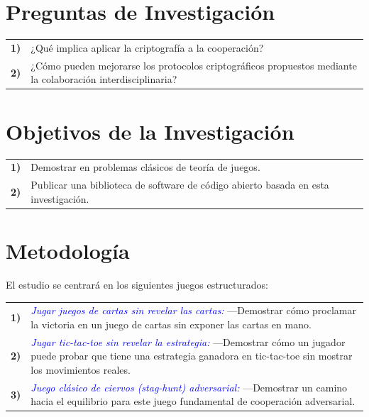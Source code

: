 \documentclass[conference]{IEEEtran}
\begin{document}
\vspace{-5pt}
\section{Preguntas de Investigación}

\begin{tabular}{lp{210pt}}
    {\small \textbf{1)}} & {\small ¿Qué implica aplicar la criptografía a la cooperación?} \\ 
    {\small \textbf{2)}} & {\small ¿Cómo pueden mejorarse los protocolos criptográficos propuestos mediante la colaboración interdisciplinaria?}
\end{tabular}
    
\vspace{-5pt}
\section{Objetivos de la Investigación}

\begin{tabular}{lp{210pt}}
    {\small \textbf{1)}} & {\small Demostrar en problemas clásicos de teoría de juegos.} \\ 
    {\small \textbf{2)}} & {\small Publicar una biblioteca de software de código abierto basada en esta investigación.}
\end{tabular}

\vspace{-5pt}
\section{Metodología}
El estudio se centrará en los siguientes juegos estructurados:

\begin{tabular}{lp{210pt}}
    {\small \textbf{1)}} & {\textcolor{blue}{\textit{Jugar juegos de cartas sin revelar las cartas:}} \linebreak ---Demostrar cómo proclamar la victoria en un juego de cartas sin exponer las cartas en mano.} \\
    {\small \textbf{2)}} & {\textcolor{blue}{\textit{Jugar tic-tac-toe sin revelar la estrategia:}} \linebreak ---Demostrar cómo un jugador puede probar que tiene una estrategia ganadora en tic-tac-toe sin mostrar los movimientos reales.} \\
    {\small \textbf{3)}} & {\textcolor{blue}{\textit{Juego clásico de ciervos (stag-hunt) adversarial:}} \linebreak ---Demostrar un camino hacia el equilibrio para este juego fundamental de cooperación adversarial.}
\end{tabular}
\end{document}
